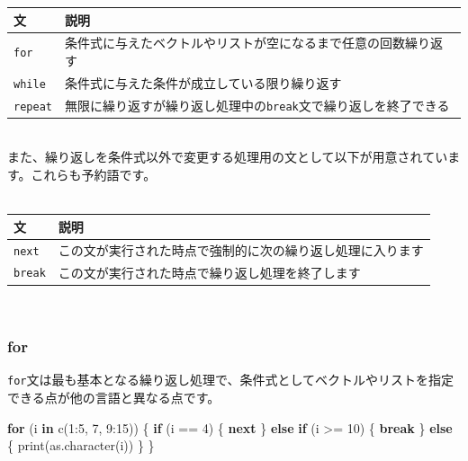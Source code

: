 \documentclass[
  12pt,
]{book}
\newenvironment{Shaded}{\begin{snugshade}}{\end{snugshade}}
\newcommand{\ControlFlowTok}[1]{\textcolor[rgb]{0.13,0.29,0.53}{\textbf{#1}}}
\newcommand{\DecValTok}[1]{\textcolor[rgb]{0.00,0.00,0.81}{#1}}
\newcommand{\FunctionTok}[1]{\textcolor[rgb]{0.00,0.00,0.00}{#1}}
\newcommand{\NormalTok}[1]{#1}
\newcommand{\SpecialCharTok}[1]{\textcolor[rgb]{0.00,0.00,0.00}{#1}}
\begin{document}
\begin{longtable}[]{@{}ll@{}}
\toprule
文 & 説明 \\
\midrule
\endhead
\texttt{for} & 条件式に与えたベクトルやリストが空になるまで任意の回数繰り返す \\
\texttt{while} & 条件式に与えた条件が成立している限り繰り返す \\
\texttt{repeat} & 無限に繰り返すが繰り返し処理中の\texttt{break}文で繰り返しを終了できる \\
\bottomrule
\end{longtable}

　\\
また、繰り返しを条件式以外で変更する処理用の文として以下が用意されています。これらも予約語です。\\
　

\begin{longtable}[]{@{}ll@{}}
\toprule
文 & 説明 \\
\midrule
\endhead
\texttt{next} & この文が実行された時点で強制的に次の繰り返し処理に入ります \\
\texttt{break} & この文が実行された時点で繰り返し処理を終了します \\
\bottomrule
\end{longtable}

　

\hypertarget{for}{%
\subsubsection{for}\label{for}}

\texttt{for}文は最も基本となる繰り返し処理で、条件式としてベクトルやリストを指定できる点が他の言語と異なる点です。

\begin{Shaded}
\begin{Highlighting}[]
\ControlFlowTok{for}\NormalTok{ (i }\ControlFlowTok{in} \FunctionTok{c}\NormalTok{(}\DecValTok{1}\SpecialCharTok{:}\DecValTok{5}\NormalTok{, }\DecValTok{7}\NormalTok{, }\DecValTok{9}\SpecialCharTok{:}\DecValTok{15}\NormalTok{)) \{}
  \ControlFlowTok{if}\NormalTok{ (i }\SpecialCharTok{==} \DecValTok{4}\NormalTok{) \{}
    \ControlFlowTok{next}
\NormalTok{  \} }\ControlFlowTok{else} \ControlFlowTok{if}\NormalTok{ (i }\SpecialCharTok{\textgreater{}=} \DecValTok{10}\NormalTok{) \{}
    \ControlFlowTok{break}
\NormalTok{  \} }\ControlFlowTok{else}\NormalTok{ \{}
    \FunctionTok{print}\NormalTok{(}\FunctionTok{as.character}\NormalTok{(i))}
\NormalTok{  \}}
\NormalTok{\}}
\end{Highlighting}
\end{Shaded}
\end{document}
